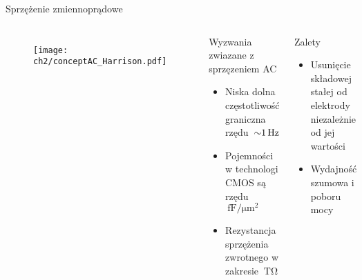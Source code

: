 \begin{frame}{Sprzężenie zmiennoprądowe}
    \begin{columns}

    \begin{figure}[H]
        \centering
        \texttt{[image: ch2/conceptAC\_Harrison.pdf]} 
    \end{figure}
    \begin{alertblock}{Wyzwania zwiazane z sprzęzeniem AC}
        \begin{itemize}
            \item Niska dolna częstotliwość graniczna rzędu~$\SI{\sim 1}{\hertz}$ 
            \item Pojemności w technologi CMOS są rzędu $\SI{}{\femto\farad\per\micro\metre\squared}$
            \item Rezystancja sprzężenia zwrotnego w zakresie $\SI{}{\tera\ohm}$
        \end{itemize}
    \end{alertblock}
    \begin{exampleblock}{Zalety}
        \begin{itemize}
            \item Usunięcie składowej stałej od elektrody niezależnie od jej wartości
            \item Wydajność szumowa i poboru mocy
        \end{itemize}
    \end{exampleblock}
\end{columns}

\end{frame}



